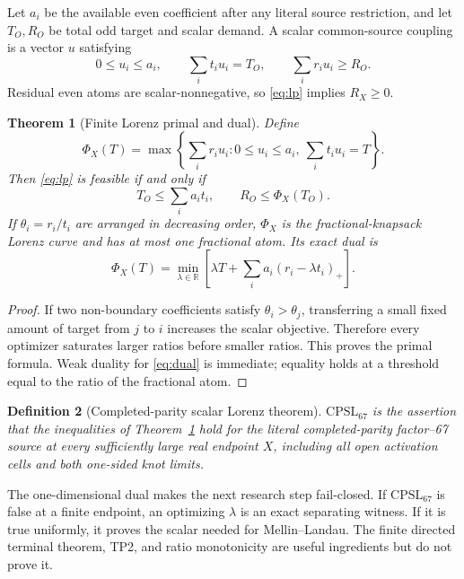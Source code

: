 \documentclass[11pt]{article}
\newtheorem{theorem}{Theorem}[section]
\newtheorem{definition}[theorem]{Definition}
\newcommand{\CPSL}{\mathrm{CPSL}_{67}}
\newcommand{\1}{\mathbf 1}
\newcommand{\R}{\mathbb R}
\begin{document}
Let $a_i$ be the available even coefficient after any literal source restriction, and let $T_O,R_O$ be total odd target and scalar demand.  A scalar common-source coupling is a vector $u$ satisfying
\begin{equation}\label{eq:lp}
0\le u_i\le a_i,
\qquad\sum_i t_i u_i=T_O,
\qquad\sum_i r_i u_i\ge R_O.
\end{equation}
Residual even atoms are scalar-nonnegative, so \eqref{eq:lp} implies $R_X\ge0$.

\begin{theorem}[Finite Lorenz primal and dual]\label{thm:lorenz}
Define
\[
\Phi_X(T)=\max\left\{\sum_i r_i u_i:
0\le u_i\le a_i,\ \sum_i t_i u_i=T\right\}.
\]
Then \eqref{eq:lp} is feasible if and only if
\[
T_O\le\sum_i a_it_i,
\qquad R_O\le\Phi_X(T_O).
\]
If $\theta_i=r_i/t_i$ are arranged in decreasing order, $\Phi_X$ is the fractional-knapsack Lorenz curve and has at most one fractional atom.  Its exact dual is
\begin{equation}\label{eq:dual}
\boxed{
\Phi_X(T)=\min_{\lambda\in\R}
\left[\lambda T+\sum_i a_i(r_i-\lambda t_i)_+\right].}
\end{equation}
\end{theorem}
\begin{proof}
If two non-boundary coefficients satisfy $\theta_i>\theta_j$, transferring a small fixed amount of target from $j$ to $i$ increases the scalar objective.  Therefore every optimizer saturates larger ratios before smaller ratios.  This proves the primal formula.  Weak duality for \eqref{eq:dual} is immediate; equality holds at a threshold equal to the ratio of the fractional atom.
\end{proof}

\begin{definition}[Completed-parity scalar Lorenz theorem]\label{def:cpsl}
$\CPSL$ is the assertion that the inequalities of Theorem~\ref{thm:lorenz} hold for the literal completed-parity factor--67 source at every sufficiently large real endpoint $X$, including all open activation cells and both one-sided knot limits.
\end{definition}

The one-dimensional dual makes the next research step fail-closed.  If $\CPSL$ is false at a finite endpoint, an optimizing $\lambda$ is an exact separating witness.  If it is true uniformly, it proves the scalar needed for Mellin--Landau.  The finite directed terminal theorem, TP2, and ratio monotonicity are useful ingredients but do not prove it.
\end{document}

